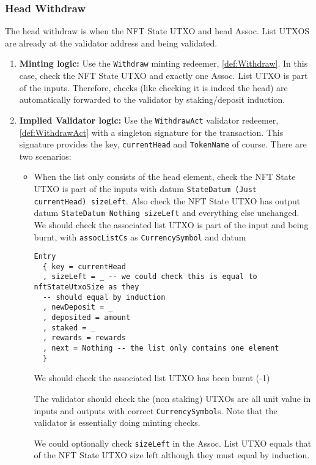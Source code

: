 \documentclass[10pt, a4paper]{article}
\theoremstyle{definition}
\begin{document}
\subsubsection{Head Withdraw}\label{subsubsection:HeadWithdraw}
The head withdraw is when the NFT State UTXO and head Assoc. List UTXOS are already at the validator address and being validated.
\begin{enumerate}
\item{\textbf{Minting logic:} Use the \texttt{Withdraw} minting redeemer, \ref{def:Withdraw}. In this case, check the NFT State UTXO and exactly one Assoc. List UTXO is part of the inputs. Therefore, checks (like checking it is indeed the head) are automatically forwarded to the validator by staking/deposit induction.}
\item{\textbf{Implied Validator logic:} Use the \texttt{WithdrawAct} validator redeemer, \ref{def:WithdrawAct} with a singleton signature for the transaction. This signature provides the key, \texttt{currentHead} and \texttt{TokenName} of course. There are two scenarios:

\begin{itemize}
\item{When the list only consists of the head element, check the NFT State UTXO is part of the inputs with datum \texttt{StateDatum (Just currentHead) sizeLeft}. Also check the NFT State UTXO has output datum \texttt{StateDatum Nothing sizeLeft} and everything else unchanged. We should check the associated list UTXO is part of the input and being burnt, with \texttt{assocListCs} as \texttt{CurrencySymbol} and datum
\begin{verbatim}
Entry  
  { key = currentHead
  , sizeLeft = _ -- we could check this is equal to nftStateUtxoSize as they
  -- should equal by induction
  , newDeposit = _
  , deposited = amount
  , staked = _
  , rewards = rewards 
  , next = Nothing -- the list only contains one element
  }
\end{verbatim}

 We should check the associated list UTXO has been burnt (-1)

The validator should check the (non staking) UTXOs are all unit value in inputs and outputs with correct \texttt{CurrencySymbol}s. Note that the validator is essentially doing minting checks.

We could optionally check \texttt{sizeLeft} in the Assoc. List UTXO equals that of the NFT State UTXO size left although they must equal by induction.

}
\end{itemize}}
\end{enumerate}
\end{document}
